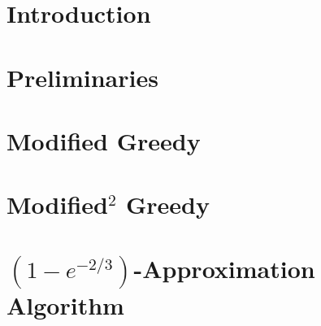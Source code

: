 \newcommand\todo[1]{\textcolor{red}{TODO #1}\newline}


\section{Introduction}

\section{Preliminaries}

\section{Modified Greedy}

\section{\texorpdfstring{Modified$^2$ Greedy}{Modified\^{}2 Greedy}}

\section{\texorpdfstring{$(1 - e^{-2/3})$}{(1 - e\^-2/3)}-Approximation Algorithm}
